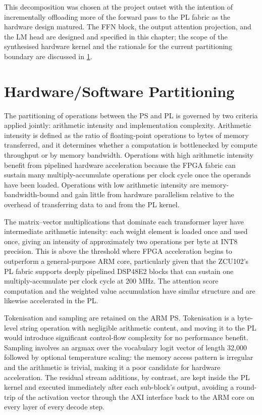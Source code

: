 This decomposition was chosen at the project outset with the intention of
incrementally offloading more of the forward pass to the PL fabric as the
hardware design matured. The FFN block, the output attention projection, and
the LM head are designed and specified in this chapter; the scope of the
synthesised hardware kernel and the rationale for the current partitioning
boundary are discussed in \cref{sec:hw_sw_partition}.

\section{Hardware/Software Partitioning}
\label{sec:hw_sw_partition}

The partitioning of operations between the PS and PL is governed by two
criteria applied jointly: arithmetic intensity and implementation complexity.
Arithmetic intensity is defined as the ratio of floating-point operations to
bytes of memory transferred, and it determines whether a computation is
bottlenecked by compute throughput or by memory bandwidth. Operations with
high arithmetic intensity benefit from pipelined hardware acceleration because
the FPGA fabric can sustain many multiply-accumulate operations per clock
cycle once the operands have been loaded. Operations with low arithmetic
intensity are memory-bandwidth-bound and gain little from hardware parallelism
relative to the overhead of transferring data to and from the PL kernel.

The matrix--vector multiplications that dominate each transformer layer have
intermediate arithmetic intensity: each weight element is loaded once and used
once, giving an intensity of approximately two operations per byte at INT8
precision. This is above the threshold where FPGA acceleration begins to
outperform a general-purpose ARM core, particularly given that the ZCU102's
PL fabric supports deeply pipelined DSP48E2 blocks that can sustain one
multiply-accumulate per clock cycle at 200 MHz. The attention score
computation and the weighted value accumulation have similar structure and
are likewise accelerated in the PL.

Tokenisation and sampling are retained on the ARM PS.
Tokenisation is a byte-level string operation with negligible arithmetic
content, and moving it to the PL would introduce significant control-flow
complexity for no performance benefit. Sampling involves an argmax over the
vocabulary logit vector of length 32{,}000 followed by optional temperature
scaling: the memory access pattern is irregular and the arithmetic is trivial,
making it a poor candidate for hardware acceleration. The residual stream
additions, by contrast, are kept inside the PL kernel and executed immediately
after each sub-block's output, avoiding a round-trip of the activation vector
through the AXI interface back to the ARM core on every layer of every decode step.




